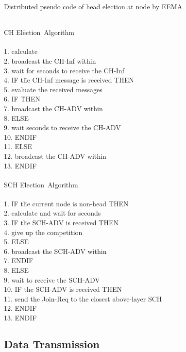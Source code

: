 \documentclass[journal]{IEEEtran}
\begin{document}
\begin{algorithm}
\caption{Distributed pseudo code of head election at node  by EEMA}
\begin{tabbing}
\label{EEMA}
\\
 CH El\=ection~Algorithm \\
\\
1. \> calculate \\
2. \> broadcast the CH-Inf within \\
3. \> wait for  seconds to receive the CH-Inf\\
4. \> IF t\=he CH-Inf message is received THEN\\
5. \>\> evaluate the received messages\\
6. \>\> IF \= THEN\\
7. \>\>\> broadcast the CH-ADV within \\
8. \>\> ELSE\=\\
9. \>\>\> wait  seconds to receive the CH-ADV\\
10. \>\> ENDIF\\
11. \> ELSE\=\\
12. \>\> broadcast the CH-ADV within \\
13. \> ENDIF \\
\\
 SCH E\=lection~Algorithm \\
\\
1. \>IF t\=he current node is non-head THEN\\
2. \>\> calculate  and wait for  seconds\\
3. \>\> IF t\=he SCH-ADV is received THEN\\
4. \>\>\> give up the competition\\
5. \>\> ELSE\=\\
6. \>\>\> broadcast the SCH-ADV within \\
7. \>\> ENDIF\\
8. \> ELSE\=\\
9.\>\> wait to receive the SCH-ADV\\
10.\>\> IF the SCH-ADV is received THEN\\
11.\>\>\> send the Join-Req to the closest above-layer SCH\\
12.\>\> ENDIF\\
13. \> ENDIF\\

\end{tabbing}
\end{algorithm}

\subsection{Data Transmission}
\label{subsec:cl-fo}
\end{document}
